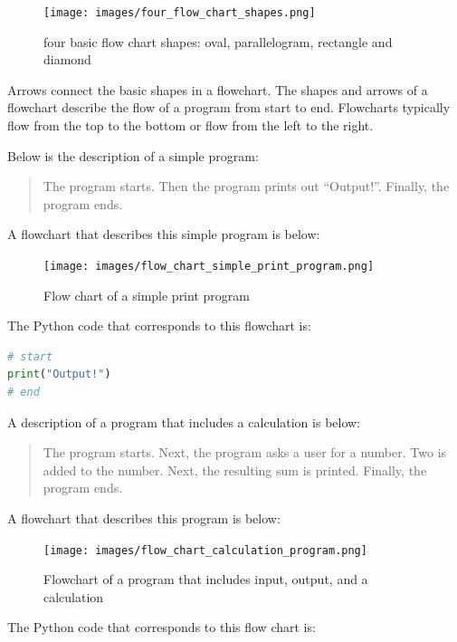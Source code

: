 \documentclass{book}
\begin{document}
\begin{figure}
\centering
\texttt{[image: images/four\_flow\_chart\_shapes.png]}
\caption{four basic flow chart shapes: oval, parallelogram, rectangle
and diamond}
\end{figure}

Arrows connect the basic shapes in a flowchart. The shapes and arrows of
a flowchart describe the flow of a program from start to end. Flowcharts
typically flow from the top to the bottom or flow from the left to the
right.
    




    
        Below is the description of a simple program:

\begin{quote}
The program starts. Then the program prints out ``Output!''. Finally,
the program ends.
\end{quote}

A flowchart that describes this simple program is below:

\begin{figure}
\centering
\texttt{[image: images/flow\_chart\_simple\_print\_program.png]}
\caption{Flow chart of a simple print program}
\end{figure}

The Python code that corresponds to this flowchart is:

\begin{lstlisting}[language=Python]
# start
print("Output!")
# end
\end{lstlisting}
    




    
        A description of a program that includes a calculation is below:

\begin{quote}
The program starts. Next, the program asks a user for a number. Two is
added to the number. Next, the resulting sum is printed. Finally, the
program ends.
\end{quote}

A flowchart that describes this program is below:

\begin{figure}
\centering
\texttt{[image: images/flow\_chart\_calculation\_program.png]}
\caption{Flowchart of a program that includes input, output, and a
calculation}
\end{figure}

The Python code that corresponds to this flow chart is:
\end{document}

